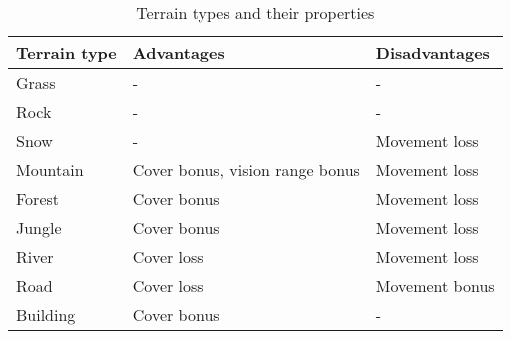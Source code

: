 \begin{table}[H]
    \label{tab:terrain}
    \begin{center}
    \begin{tabular}{| l | m{5cm} | m{5cm} |}
        \hline
        \textbf{Terrain type} & \textbf{Advantages} & \textbf{Disadvantages} \\
        \hline
        Grass & -& - \\
        \hline
        Rock & - & - \\
        \hline
        Snow & - & Movement loss \\
        \hline
        Mountain & Cover bonus, vision range bonus & Movement loss \\
        \hline
        Forest & Cover bonus & Movement loss \\
        \hline
        Jungle & Cover bonus & Movement loss \\
        \hline
        River & Cover loss & Movement loss \\
        \hline
        Road & Cover loss & Movement bonus \\
        \hline
        Building & Cover bonus & - \\
        \hline
    \end{tabular}
    \end{center}
\caption{Terrain types and their properties}
\end{table}


